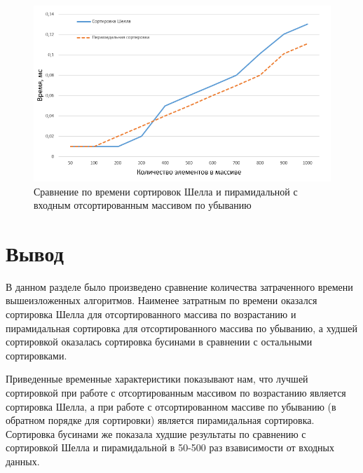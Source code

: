 \clearpage

\begin{figure}[h]
	\centering
	\includegraphics[height=0.3\textheight]{img/rsort_2.png}
	\caption{Сравнение по времени сортировок Шелла и пирамидальной с входным отсортированным массивом по убыванию}
	\label{plt:rsort_2}
\end{figure}

\section{Вывод}
В данном разделе было произведено сравнение количества затраченного времени вышеизложенных алгоритмов. Наименее затратным по времени оказался сортировка Шелла для отсортированного массива по возрастанию и пирамидальная сортировка для отсортированного массива по убыванию, а худшей сортировкой оказалась сортировка бусинами в сравнении с остальными сортировками.

Приведенные временные характеристики показывают нам, что лучшей сортировкой при работе с отсортированным массивом по возрастанию является сортировка Шелла, а при работе с отсортированном массиве по убыванию (в обратном порядке для сортировки) является пирамидальная сортировка. Сортировка бусинами же показала худшие результаты по сравнению с сортировкой Шелла и пирамидальной в 50-500 раз взависимости от входных данных.
